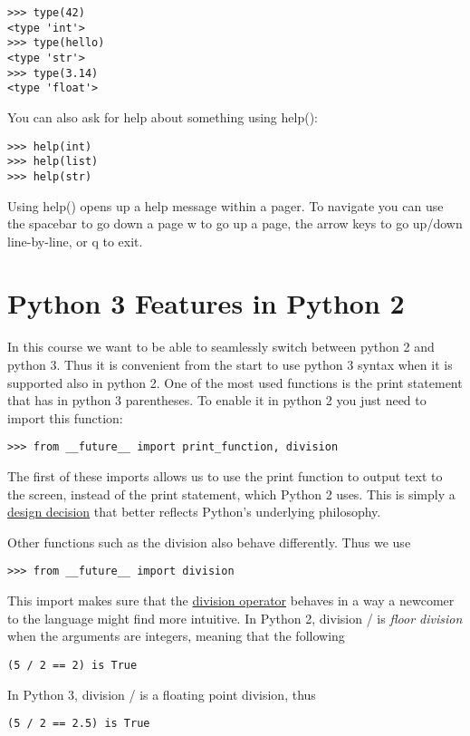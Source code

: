 \begin{lstlisting}
>>> type(42)
<type 'int'>
>>> type(hello)
<type 'str'>
>>> type(3.14)
<type 'float'>
\end{lstlisting}


You can also ask for help about something using help():

\begin{lstlisting}
>>> help(int)
>>> help(list)
>>> help(str)
\end{lstlisting}

Using help() opens up a help message within a pager. To navigate you
can use the spacebar to go down a page w to go up a page, the arrow
keys to go up/down line-by-line, or q to exit.

\section{Python 3 Features in Python 2}\label{python-3-features-in-python-2}

In this course we want to be able to seamlessly switch between python 2
and python 3. Thus it is convenient from the start to use python 3
syntax when it is supported also in python 2. One of the most used
functions is the print statement that has in python 3 parentheses. To
enable it in python 2 you just need to import this function:

\begin{lstlisting}
>>> from __future__ import print_function, division
\end{lstlisting}

The first of these imports allows us to use the print function to output
text to the screen, instead of the print statement, which Python 2 uses.
This is simply a \href{https://www.python.org/dev/peps/pep-3105/}{design
decision} that better reflects Python's underlying philosophy.


Other functions such as the division also behave differently. Thus we use

\begin{lstlisting}
>>> from __future__ import division
\end{lstlisting}

This import makes sure that the
\href{https://www.python.org/dev/peps/pep-0238/}{division operator}
behaves in a way a newcomer to the language might find more
intuitive.  In Python 2, division / is \emph{floor division} when the
arguments are integers, meaning that the following 

\begin{lstlisting}
(5 / 2 == 2) is True
\end{lstlisting}

In Python 3, division / is a floating point division, thus 

\begin{lstlisting}
(5 / 2 == 2.5) is True
\end{lstlisting}
